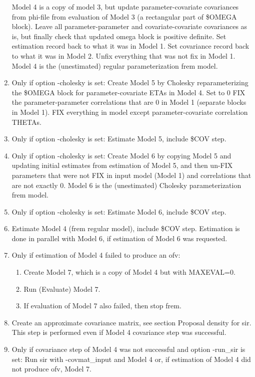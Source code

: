 \begin{enumerate}
Model 4 is a copy of model 3, but update parameter-covariate covariances from phi-file from evaluation of Model 3
(a rectangular part of \$OMEGA block).
Leave all parameter-parameter and covariate-covariate covariances as is, but
finally check that updated omega block is positive definite.
Set estimation record back to what it was in Model 1.
Set covariance record back to what it was in Model 2.
Unfix everything that was not fix in Model 1.
Model 4 is the (unestimated) regular parameterization frem model.
\item
Only if option -cholesky is set: Create Model 5 by
Cholesky reparameterizing the \$OMEGA block
for parameter-covariate ETAs in Model 4.
Set to 0 FIX the parameter-parameter correlations that are 0 in Model 1 (separate blocks in Model 1).
FIX everything in model except parameter-covariate correlation THETAs.
\item Only if option -cholesky is set: Estimate Model 5, include \$COV step.
\item Only if option -cholesky is set: Create Model 6
by copying Model 5 and updating initial estimates from
estimation of Model 5, and then un-FIX parameters that
were not FIX in input model (Model 1) and correlations that are not exactly 0.
Model 6 is the (unestimated) Cholesky parameterization frem model.
\item Only if option -cholesky is set:
Estimate Model 6, include \$COV step.
\item
Estimate Model 4 (frem regular model), include \$COV step.
Estimation is done in parallel with Model 6, if estimation of Model 6 was requested.
\item Only if estimation of Model 4 failed to produce an ofv:

\begin{enumerate}
\item Create Model 7, which is a copy of Model 4 but with MAXEVAL=0.
\item Run (Evaluate) Model 7.
\item If evaluation of Model 7 also failed, then stop frem.
\end{enumerate}
\item Create an approximate covariance matrix, see section Proposal density for sir.
This step is performed even if Model 4 covariance step was successful.
\item Only if covariance step of Model 4 was not successful and option -run\_sir is set:
Run sir with -covmat\_input and Model 4 or, if estimation of Model 4 did not produce ofv, Model 7.
\end{enumerate}



